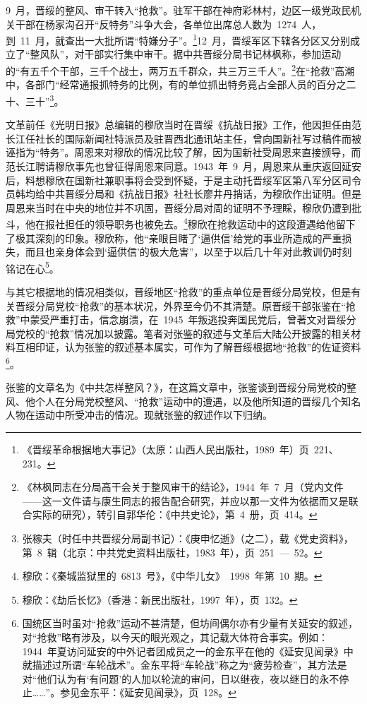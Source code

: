 9~月，晋绥的整风、审干转入“抢救”。驻军干部在神府彩林村，边区一级党政民机关干部在杨家沟召开“反特务”斗争大会，各单位出席总人数为~1274~人，到~11~月，就查出一大批所谓“特嫌分子”。\footnote{《晋绥革命根据地大事记》（太原：山西人民出版社，1989~年）页~221、231。}12~月，晋绥军区下辖各分区又分别成立了“整风队”，对干部实行集中审干。据中共晋绥分局书记林枫称，参加运动的“有五千个干部，三千个战士，两万五千群众，共三万三千人”。\footnote{《林枫同志在分局高干会关于整风审干的结论》，1944~年~7~月（党内文件——这一文件请与康生同志的报告配合研究，并应以那一文件为依据而又是联合实际的研究），转引自郭华伦：《中共史论》，第~4~册，页~414。}在“抢救”高潮中，各部门“经常通报抓特务的比例，有的单位抓出特务竟占全部人员的百分之二十、三十”\footnote{张稼夫（时任中共晋绥分局副书记）：《庚申忆逝》（之二），载《党史资料》，第~8~辑（北京：中共党史资料出版社，1983~年），页~251~—~52。}。

文革前任《光明日报》总编辑的穆欣当时在晋绥《抗战日报》工作，他因担任由范长江任社长的国际新闻社特派员及驻晋西北通讯站主任，曾向国新社写过稿件而被诬指为“特务”。周恩来对穆欣的情况比较了解，因为国新社受周恩来直接颁导，而范长江聘请穆欣事先也曾征得周恩来同意。1943~年~9~月，周恩来从重庆返回延安后，料想穆欣在国新社兼职事将会受到怀疑，于是主动托晋绥军区第八军分区司令员韩均给中共晋绥分局和《抗战日报》社社长廖井丹捎话，为穆欣作出证明。但是周恩来当时在中央的地位并不巩固，晋绥分局对周的证明不予理睬，穆欣仍遭到批斗，他在报社担任的领导职务也被免去。\footnote{穆欣：《秦城监狱里的~6813~号》，《中华儿女》~1998~年第~10~期。}穆欣在抢救运动中的这段遭遇给他留下了极其深刻的印象。穆欣称，他“亲眼目睹了‘逼供信’给党的事业所造成的严重损失，而且也亲身体会到‘逼供信’的极大危害”，以至于以后几十年对此教训仍时刻铭记在心\footnote{穆欣：《劫后长忆》（香港：新民出版社，1997~年），页~132。}。

与其它根据地的情况相类似，晋绥地区“抢救”的重点单位是晋绥分局党校，但是有关晋绥分局党校“抢救”的基本状况，外界至今仍不其清楚。原晋绥干部张鉴在“抢救”中蒙受严重打击，信念崩溃，在~1945~年叛逃投奔国民党后，曾著文对晋绥分局党校的“抢救”情况加以披露。笔者对张鉴的叙述与文革后大陆公开披露的相关材料互相印证，认为张鉴的叙述基本属实，可作为了解晋绥根据地“抢救”的佐证资料\footnote{国统区当时虽对“抢救”运动不甚清楚，但坊间偶尔亦有少量有关延安的叙述，对“抢救”略有涉及，以今天的眼光观之，其记载大体符合事实。例如：1944~年夏访问延安的中外记者团成员之一的金东平在他的《延安见闻录》中就描述过所谓“车轮战术”。金东平将“车轮战”称之为“疲劳检查”，其方法是对“他们认为有‘有问题’的人加以轮流的审问，日以继夜，夜以继日的永不停止……”。参见金东平：《延安见闻录》，页~128。}。

张鉴的文章名为《中共怎样整风？》，在这篇文章中，张鉴谈到晋绥分局党校的整风、他个人在分局党校整风、“抢救”运动中的遭遇，以及他所知道的晋绥几个知名人物在运动中所受冲击的情况。现就张鉴的叙述作以下归纳。

